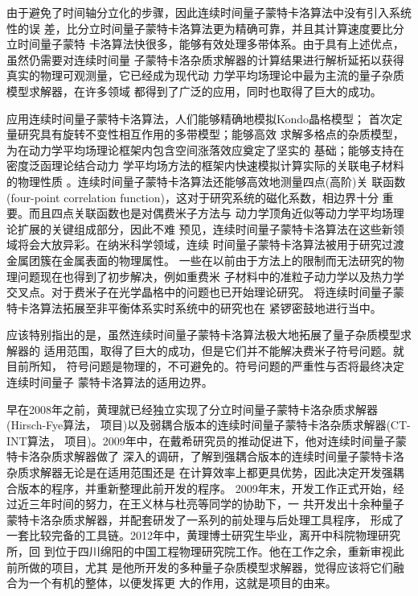 由于避免了时间轴分立化的步骤，因此连续时间量子蒙特卡洛算法中没有引入系统性的误
差，比分立时间量子蒙特卡洛算法更为精确可靠，并且其计算速度要比分立时间量子蒙特
卡洛算法快很多，能够有效处理多带体系。由于具有上述优点，虽然仍需要对连续时间量
子蒙特卡洛杂质求解器的计算结果进行解析延拓以获得真实的物理可观测量，它已经成为现代动
力学平均场理论中最为主流的量子杂质模型求解器\cite{gull:235123,blumer:205120}，在许多领域
都得到了广泛的应用\cite{gull:349}，同时也取得了巨大的成功。

应用连续时间量子蒙特卡洛算法，人们能够精确地模拟Kondo晶格模型\cite{matsumoto:096403}；
首次定量研究具有旋转不变性相互作用的多带模型\cite{rubtsov:035122,werner:155107,
haule:155113,werner:126405,werner:166405,werner:115119,chan:235114}；能够高效
求解多格点的杂质模型，为在动力学平均场理论框架内包含空间涨落效应奠定了坚实的
基础\cite{haule:104509,gull:37009,park:186403,ferrero:064501,gull:245102,
mikelsons:140505,werner:045120,sordi:226402}；能够支持在密度泛函理论结合动力
学平均场方法的框架内快速模拟计算实际的关联电子材料的物理性质
\cite{marianetti:246404}。连续时间量子蒙特卡洛算法还能够高效地测量四点(高阶)关
联函数(four-point correlation function)，这对于研究系统的磁化系数，相边界十分
重要。而且四点关联函数也是对偶费米子方法\cite{slezak:435604,rubtsov:033101}与
动力学顶角近似\cite{toschi:045118}等动力学平均场理论扩展的关键组成部分，因此不难
预见，连续时间量子蒙特卡洛算法在这些新领域将会大放异彩。在纳米科学领域，连续
时间量子蒙特卡洛算法被用于研究过渡金属团簇在金属表面的物理属性\cite{savkin:026402}。
一些在以前由于方法上的限制而无法研究的物理问题现在也得到了初步解决，例如重费米
子材料中的准粒子动力学以及热力学交叉点\cite{haule:092503,shim:1615,shim:2007,
park:035107}。对于费米子在光学晶格中的问题也已开始理论研究\cite{leo:210403,dao:236405}。
将连续时间量子蒙特卡洛算法拓展至非平衡体系实时系统中的研究\cite{werner:035108,
werner:035320,muhlbacher:176403,schiro:2010,schiro:153302,schmidt:235110}也在
紧锣密鼓地进行当中。

应该特别指出的是，虽然连续时间量子蒙特卡洛算法极大地拓展了量子杂质模型求解器的
适用范围，取得了巨大的成功，但是它们并不能解决费米子符号问题。就目前所知，
符号问题是物理的，不可避免的。符号问题的严重性与否将最终决定连续时间量子
蒙特卡洛算法的适用边界。

早在2008年之前，黄理就已经独立实现了分立时间量子蒙特卡洛杂质求解器(Hirsch-Fye算法，
{\daisy}项目)以及弱耦合版本的连续时间量子蒙特卡洛杂质求解器(CT-INT算法，{\sakura}
项目)。2009年中，在戴希研究员的推动促进下，他对连续时间量子蒙特卡洛杂质求解器做了
深入的调研，了解到强耦合版本的连续时间量子蒙特卡洛杂质求解器无论是在适用范围还是
在计算效率上都更具优势，因此决定开发强耦合版本的程序，并重新整理此前开发的程序。
2009年末，开发工作正式开始，经过近三年时间的努力，在王义林与杜亮等同学的协助下，一
共开发出十余种量子蒙特卡洛杂质求解器，并配套研发了一系列的前处理与后处理工具程序，
形成了一套比较完备的工具链。2012年中，黄理博士研究生毕业，离开中科院物理研究所，回
到位于四川绵阳的中国工程物理研究院工作。他在工作之余，重新审视此前所做的项目，尤其
是他所开发的多种量子杂质模型求解器，觉得应该将它们融合为一个有机的整体，以便发挥更
大的作用，这就是{\iqist}项目的由来。

